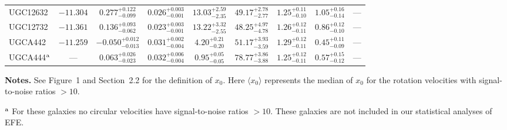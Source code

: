 \documentclass[twocolumn,tighten]{aastex63}
\begin{document}
\begin{table}
\begin{center}
\begin{tabular}{lcccccccc}
   UGC12632 & $ -11.304 $ & $ 0.277 _{ -0.099 } ^{ + 0.122 } $ & $ 0.026 _{ -0.001 } ^{ + 0.003 } $ & $ 13.03 _{ -2.35 } ^{ + 2.59 } $ & $ 49.17 _{ -2.77 } ^{ + 2.78 } $ & $ 1.25 _{ -0.10 } ^{ + 0.11 } $ & $ 1.05 _{ -0.14 } ^{ + 0.16 } $ & --- \\  
   UGC12732 & $ -11.361 $ & $ 0.136 _{ -0.062 } ^{ + 0.093 } $ & $ 0.023 _{ -0.001 } ^{ + 0.003 } $ & $ 13.22 _{ -2.55 } ^{ + 3.32 } $ & $ 48.25 _{ -4.78 } ^{ + 4.97 } $ & $ 1.26 _{ -0.11 } ^{ + 0.12 } $ & $ 0.86 _{ -0.10 } ^{ + 0.12 } $ & --- \\  
    UGCA442 & $ -11.259 $ & $ -0.050 _{ -0.013 } ^{ + 0.012 } $ & $ 0.031 _{ -0.004 } ^{ + 0.002 } $ & $ 4.20 _{ -0.20 } ^{ + 0.21 } $ & $ 51.17 _{ -3.59 } ^{ + 3.93 } $ & $ 1.29 _{ -0.11 } ^{ + 0.12 } $ & $ 0.45 _{ -0.09 } ^{ + 0.11 } $ & --- \\  
    UGCA444$^{\rm a}$ &  ---  & $ 0.063 _{ -0.023 } ^{ + 0.026 } $ & $ 0.032 _{ -0.004 } ^{ + 0.006 } $ & $ 0.95 _{ -0.05 } ^{ + 0.05 } $ & $ 78.77 _{ -3.88 } ^{ + 3.86 } $ & $ 1.25 _{ -0.11 } ^{ + 0.12 } $ & $ 0.57 _{ -0.12 } ^{ + 0.15 } $ & --- \\  
 \hline
\end{tabular}
\end{center}

{\bf Notes.} See Figure~1 and Section~2.2 for the definition of $x_0$. Here $\langle x_0\rangle$ represents the median of $x_0$ for the rotation velocities with signal-to-noise ratios $> 10$.

$^{\rm a}$ For these galaxies no circular velocities have signal-to-noise ratios $> 10$. These galaxies are not included in our statistical analyses of EFE.

\end{table}
\end{document}
